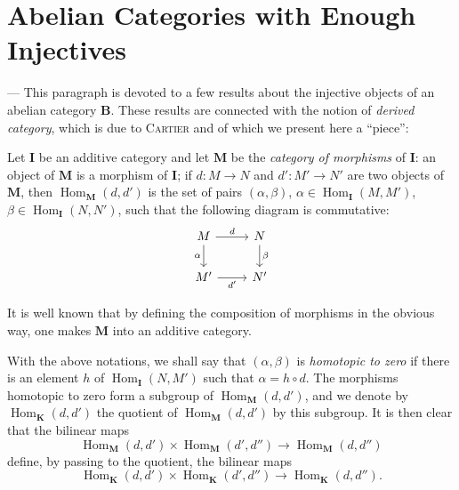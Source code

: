 %
\section{Abelian Categories with Enough Injectives}
--- This paragraph is devoted to a few results about the injective objects
of an abelian category $\mathbf{B}$. These results are connected with the
notion of \emph{derived category}, which is due to \textsc{Cartier} and of
which we present here a ``piece'':

Let $\mathbf{I}$ be an additive category and let $\mathbf{M}$ be the
\emph{category of morphisms} of $\mathbf{I}$: an object of $\mathbf{M}$ is a
morphism of $\mathbf{I}$; if $d\colon M\to N$ and $d'\colon M'\to N'$ are two
objects of $\mathbf{M}$, then $\operatorname{Hom}_{\mathbf{M}}(d,d')$ is the
set of pairs $(\alpha,\beta)$, $\alpha\in\operatorname{Hom}_{\mathbf{I}}(M,M')$,
$\beta\in\operatorname{Hom}_{\mathbf{I}}(N,N')$, such that the following diagram
is commutative:
\[
\begin{tikzcd}
M \arrow[r, "d"] \arrow[d, "\alpha"'] & N \arrow[d, "\beta"] \\
M' \arrow[r, "d'"'] & N'
\end{tikzcd}
\]

It is well known that by defining the composition of morphisms in the obvious
way, one makes $\mathbf{M}$ into an additive category.

With the above notations, we shall say that $(\alpha,\beta)$ is
\emph{homotopic to zero} if there is an element $h$ of
$\operatorname{Hom}_{\mathbf{I}}(N,M')$ such that $\alpha = h\circ d$. The
morphisms homotopic to zero form a subgroup of
$\operatorname{Hom}_{\mathbf{M}}(d,d')$, and we denote by
$\operatorname{Hom}_{\mathbf{K}}(d,d')$ the quotient of
$\operatorname{Hom}_{\mathbf{M}}(d,d')$ by this subgroup. It is then clear that
the bilinear maps
\[
  \operatorname{Hom}_{\mathbf{M}}(d,d') \times
  \operatorname{Hom}_{\mathbf{M}}(d',d'') \longrightarrow
  \operatorname{Hom}_{\mathbf{M}}(d,d'')
\]
define, by passing to the quotient, the bilinear maps
\[
  \operatorname{Hom}_{\mathbf{K}}(d,d') \times
  \operatorname{Hom}_{\mathbf{K}}(d',d'') \longrightarrow
  \operatorname{Hom}_{\mathbf{K}}(d,d'').
\]

